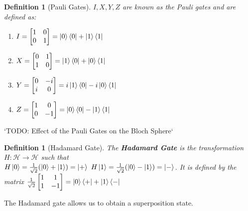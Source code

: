 \documentclass[12pt,twoside]{report}
\theoremstyle{thmstyle}
\newtheorem{defn}[subsection]{Definition}
\begin{document}
\begin{defn}[Pauli Gates]
    $I, X, Y, Z$ are known as the Pauli gates and are defined as: 
    \begin{enumerate}
        \item $I = \begin{bmatrix} 1 & 0 \\ 0 & 1 \end{bmatrix} = \ket{0}\bra{0} + \ket{1}\bra{1}$
        \item $X = \begin{bmatrix} 0 & 1 \\ 1 & 0 \end{bmatrix} = \ket{1}\bra{0} + \ket{0}\bra{1}$
        \item $Y = \begin{bmatrix} 0 & -i \\ i & 0 \end{bmatrix} = i \ket{1}\bra{0} - i \ket{0}\bra{1}$
        \item $Z = \begin{bmatrix} 1 & 0 \\ 0 & -1 \end{bmatrix} = \ket{0}\bra{0} - \ket{1}\bra{1}$
    \end{enumerate}
\end{defn}

`TODO: Effect of the Pauli Gates on the Bloch Sphere`

\begin{defn}[Hadamard Gate]
    The \textbf{Hadamard Gate} is the transformation $H: \mathcal{H} \to \mathcal{H}$ such that \\
    $H \ket{0} = \frac{1}{\sqrt{2}} (\ket{0} + \ket{1}) = \ket{+}$ 
    $H \ket{1} = \frac{1}{\sqrt{2}} (\ket{0} - \ket{1}) = \ket{-}$.  It is defined by the matrix 
    $\frac{1}{\sqrt{2}} \begin{bmatrix} 1 & 1 \\ 1 & -1 \end{bmatrix} = \ket{0}\bra{+} + \ket{1}\bra{-}$
\end{defn}
The Hadamard gate allows us to obtain a superposition state.
\end{document}
